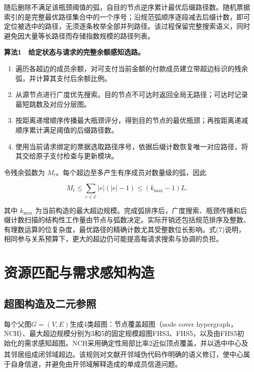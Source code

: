 \documentclass[UTF8,a4paper,twocolumn,fontset=none,zihao=5]{ctexart}
\newcommand{\upcite}[1]{\textsuperscript{\cite{#1}}}
\newcommand{\algtitle}[1]{\par\Needspace{6\baselineskip}\smallskip\noindent\textbf{#1}\par\smallskip}
\begin{document}
随后删除不满足该瓶颈阈值的弧，自目的节点逆序累计最优后缀路径数。随机票据索引的是完整最优路径集合中的一个序号；沿规范弧顺序逐段减去后缀计数，即可定位被选中的路径，无须逐条枚举全部并列路径。该过程保留完整搜索语义，同时避免因大量等长路径而存储指数规模的路径列表。


\algtitle{算法1　给定状态与请求的完整余额感知选路。}\begin{enumerate}

\item 遍历各超边的成员余额，对可支付当前金额的付款成员建立带超边标识的残余弧，并计算其支付后余额比例。

\item 从源节点进行广度优先搜索。目的节点不可达时返回全局无路径；可达时记录最短跳数及对应分层图。

\item 按距离递增顺序传播最大瓶颈评分，得到目的节点的最优瓶颈；再按距离递减顺序累计满足阈值的后缀路径数。

\item 使用当前请求绑定的票据选取路径序号，依据后缀计数恢复唯一对应路径，将其交给原子支付检查与更新模块。

\end{enumerate}

令残余弧数为 $M_t$。每个超边至多产生有序成员对数量级的弧，因此



\begin{equation}
M_t\leq\sum_{e\in\mathcal E}|e|(|e|-1)\leq(k_{\max}-1)L.
\label{eq:7}\end{equation}


其中 $k_{\max}$ 为当前构造的最大超边规模。完成弧排序后，广度搜索、瓶颈传播和后缀计数扫描的结构性工作量由节点与弧数决定。实际开销还包括规范排序及整数、有理数运算的位复杂度，最优路径的精确计数尤其受整数位长影响。式(7)说明，相同参与关系预算下，更大的超边仍可能提高每请求搜索与协调的负担。


\section{资源匹配与需求感知构造}

\subsection{超图构造及二元参照}

每个父图$G=(V,E)$生成4类超图：节点覆盖超图（node cover hypergraph，NCH）、最大超边规模分别为3和5的固定规模超图FHS3、FHS5，以及由FHS5初始化的需求感知超图。NCH采用确定性局部比率2近似顶点覆盖，并以选中中心及其邻居组成闭邻域超边。该规则对文献\upcite{r10}开邻域伪代码作明确的语义修订，使中心属于自身信道，并避免由开邻域解释造成的单成员信道问题。
\end{document}
